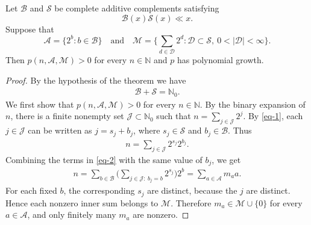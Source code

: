 \documentclass[10pt,a4paper]{amsart}
\def\N{{\mathbb N}}
\begin{document}
\begin{theorem}\label{main-thm}
Let $\mathscr{B}$ and $\mathscr{S}$ be complete additive complements satisfying 
$$
\mathscr{B}(x)\mathscr{S}(x)\ll x.
$$
Suppose that
$$
\mathcal{A}=\big\{2^b: b\in \mathscr{B}\big\} \quad \text{and} \quad \mathcal{M}=\bigg\{\sum_{d\in \mathcal{D}} 2^{d}: \mathcal{D}\subset \mathscr{S},\ 0<|\mathcal{D}|<\infty\bigg\}.
$$
Then $p(n, \mathcal{A}, \mathcal{M})>0$ for every $n\in \N$ and $p$ has polynomial growth.
\end{theorem}

\begin{proof}
By the hypothesis of the theorem we have
\begin{align}\label{eq-1}
\mathscr{B}+\mathscr{S}=\mathbb{N}_0.
\end{align}
We first show that $p(n, \mathcal{A}, \mathcal{M})>0$ for every $n\in \N$. By the binary expansion of $n$, there is a finite nonempty set $\mathcal{J}\subset \N_0$ such that
$
n=\sum_{j\in \mathcal{J}}2^j.
$
By \eqref{eq-1}, each $j\in\mathcal{J}$ can be written as $j=s_j+b_j$, where $s_j\in \mathscr{S}$ and $b_j\in \mathscr{B}$. Thus
\begin{align}\label{eq-2}
n=\sum_{j\in \mathcal{J}}2^{s_j}2^{b_j}.
\end{align}
Combining the terms in \eqref{eq-2} with the same value of $b_j$, we get
\begin{align*}
n=\sum_{b\in\mathscr{B}} \Big(\sum_{j\in\mathcal{J}:\ b_j=b} 2^{s_j}\Big)2^b=
\sum_{a\in \mathcal{A}}m_a a.
\end{align*}
For each fixed $b$, the corresponding $s_j$ are distinct, because the $j$ are distinct. Hence each nonzero inner sum belongs to $\mathcal{M}$. Therefore $m_a\in\mathcal{M}\cup\{0\}$ for every $a\in\mathcal{A}$, and only finitely many $m_a$ are nonzero.


\end{proof}
\end{document}
